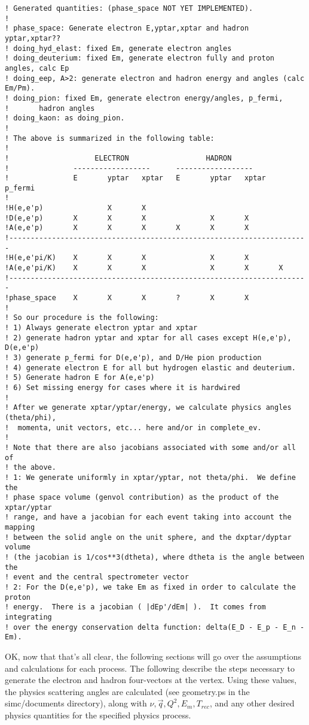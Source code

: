 \begin{verbatim}
! Generated quantities: (phase_space NOT YET IMPLEMENTED).
!
! phase_space: Generate electron E,yptar,xptar and hadron yptar,xptar??
! doing_hyd_elast: fixed Em, generate electron angles
! doing_deuterium: fixed Em, generate electron fully and proton angles, calc Ep
! doing_eep, A>2: generate electron and hadron energy and angles (calc Em/Pm).
! doing_pion: fixed Em, generate electron energy/angles, p_fermi,
!       hadron angles
! doing_kaon: as doing_pion.
!
! The above is summarized in the following table:
!
!                    ELECTRON                  HADRON
!               ------------------      ------------------
!               E       yptar   xptar   E       yptar   xptar   p_fermi
!
!H(e,e'p)               X       X
!D(e,e'p)       X       X       X               X       X
!A(e,e'p)       X       X       X       X       X       X
!----------------------------------------------------------------------
!H(e,e'pi/K)    X       X       X               X       X
!A(e,e'pi/K)    X       X       X               X       X       X
!----------------------------------------------------------------------
!phase_space    X       X       X       ?       X       X
!
! So our procedure is the following:
! 1) Always generate electron yptar and xptar
! 2) generate hadron yptar and xptar for all cases except H(e,e'p), D(e,e'p)
! 3) generate p_fermi for D(e,e'p), and D/He pion production
! 4) generate electron E for all but hydrogen elastic and deuterium.
! 5) Generate hadron E for A(e,e'p)
! 6) Set missing energy for cases where it is hardwired
!
! After we generate xptar/yptar/energy, we calculate physics angles (theta/phi),
!  momenta, unit vectors, etc... here and/or in complete_ev.
!
! Note that there are also jacobians associated with some and/or all of
! the above.
! 1: We generate uniformly in xptar/yptar, not theta/phi.  We define the
! phase space volume (genvol contribution) as the product of the xptar/yptar
! range, and have a jacobian for each event taking into account the mapping
! between the solid angle on the unit sphere, and the dxptar/dyptar volume
! (the jacobian is 1/cos**3(dtheta), where dtheta is the angle between the
! event and the central spectrometer vector
! 2: For the D(e,e'p), we take Em as fixed in order to calculate the proton
! energy.  There is a jacobian ( |dEp'/dEm| ).  It comes from integrating
! over the energy conservation delta function: delta(E_D - E_p - E_n - Em).
\end{verbatim}

OK, now that that's all clear, the following sections will go over the
assumptions and calculations for each process.  The following describe
the steps necessary to generate the electron and hadron four-vectors
at the vertex.  Using these values, the physics scattering angles are
calculated (see geometry.ps in the simc/documents directory), along with
$\nu, \vec{q}, Q^2, E_m, T_{rec}$, and any other desired physics quantities
for the specified physics process.


